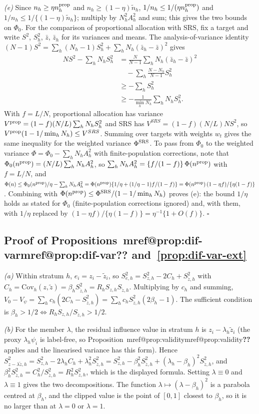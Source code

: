 \documentclass[pdflatex,sn-mathphys-num,iicol]{sn-jnl}
\makeatletter
\theoremstyle{thmstyleone}
\theoremstyle{thmstyletwo}
\theoremstyle{thmstylethree}
\newcommand{\Mref}[1]{\ifcsname mref@#1\endcsname\csname mref@#1\endcsname\else\textbf{??}\fi}
\makeatother
\begin{document}
\emph{(e)} Since $n_h\ge\eta n^{\rm prop}_h$ and $n_h\ge(1-\eta)\tilde n_h$,
$1/n_h\le1/(\eta n^{\rm prop}_h)$ and $1/n_h\le1/\{(1-\eta)\tilde n_h\}$; multiply by $N_h^2A_h^2$ and
sum; this gives the two bounds on $\Phi_0$. For the comparison of proportional allocation with SRS, fix a target and write $S^2$, $S^2_h$,
$\bar z$, $\bar z_h$ for its variances and means. The analysis-of-variance identity
$(N-1)S^2=\sum_h(N_h-1)S_h^2+\sum_hN_h(\bar z_h-\bar z)^2$ gives
\begin{align*}
NS^2-\sum_hN_hS^2_h&=\frac{N}{N-1}\sum_hN_h(\bar z_h-\bar z)^2\\
&\quad-\sum_h\frac{N-N_h}{N-1}S_h^2\\
&\ge-\sum_hS^2_h\\
&\ge-\frac{1}{\min_hN_h}\sum_hN_hS^2_h .
\end{align*}
With $f=L/N$, proportional allocation has variance $V^{\rm prop}=(1-f)(N/L)\sum_hN_hS^2_h$ and SRS has
$V^{SRS}=(1-f)(N/L)NS^2$, so $V^{\rm prop}(1-1/\min_hN_h)\le V^{SRS}$. Summing over targets with weights
$w_t$ gives the same inequality for the weighted variance $\Phi^{\rm SRS}$. To pass from $\Phi_0$ to the weighted variance $\Phi=\Phi_0-\sum_hN_hA_h^2$ with finite-population corrections, note that
$\Phi_0(n^{\rm prop})=(N/L)\sum_hN_hA_h^2$, so $\sum_hN_hA_h^2=\{f/(1-f)\}\,\Phi(n^{\rm prop})$ with $f=L/N$, and
$\Phi(n)\le\Phi_0(n^{\rm prop})/\eta-\sum_hN_hA_h^2=\Phi(n^{\rm prop})\{1/\eta+(1/\eta-1)f/(1-f)\}=\Phi(n^{\rm prop})\,(1-\eta f)/\{\eta(1-f)\}$.
Combining with $\Phi(n^{\rm prop})\le\Phi^{\rm SRS}/(1-1/\min_hN_h)$ proves (e): the bound $1/\eta$ holds as stated for $\Phi_0$ (finite-population corrections ignored) and, with them, with
$1/\eta$ replaced by $(1-\eta f)/\{\eta(1-f)\}=\eta^{-1}\{1+O(f)\}$. $\square$

\subsection{Proof of Propositions~\Mref{prop:dif-var} and~\ref{prop:dif-var-ext}}

\emph{(a)} Within stratum $h$, $e_i=z_i-\tilde z_i$, so $S^2_{e,h}=S^2_{z,h}-2C_h+S^2_{\tilde z,h}$ with $C_h=\mathrm{Cov}_h(z,\tilde z)=\beta_hS^2_{\tilde z,h}=R_hS_{z,h}S_{\tilde z,h}$.
Multiplying by $c_h$ and summing, $V_0-V_\psi=\sum_hc_h(2C_h-S^2_{\tilde z,h})=\sum_hc_hS^2_{\tilde z,h}(2\beta_h-1)$. The sufficient condition is $\beta_h>1/2\iff R_hS_{z,h}/S_{\tilde z,h}>1/2$.

\emph{(b)} For the member $\lambda$, the residual influence value in stratum $h$ is $z_i-\lambda_h\tilde z_i$ (the proxy $\lambda_h\psi_i$ is label-free, so Proposition~\Mref{prop:validity} applies and the linearised
variance has this form). Hence $S^2_{z-\lambda\tilde z,h}=S^2_{z,h}-2\lambda_hC_h+\lambda_h^2S^2_{\tilde z,h}=S^2_{z,h}-\beta_h^2S^2_{\tilde z,h}+(\lambda_h-\beta_h)^2S^2_{\tilde z,h}$, and
$\beta_h^2S^2_{\tilde z,h}=C_h^2/S^2_{\tilde z,h}=R_h^2S^2_{z,h}$, which is the displayed formula. Setting $\lambda\equiv0$ and $\lambda\equiv1$ gives the two decompositions. The function $\lambda\mapsto(\lambda-\beta_h)^2$
is a parabola centred at $\beta_h$, and the clipped value is the point of $[0,1]$ closest to $\beta_h$, so it is no larger than at $\lambda=0$ or $\lambda=1$.
\end{document}
